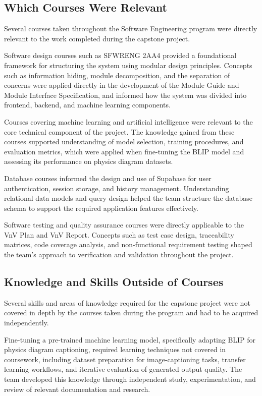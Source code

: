 \documentclass{article}
\begin{document}
\subsection{Which Courses Were Relevant}

Several courses taken throughout the Software Engineering program were directly 
relevant to the work completed during the capstone project.

Software design courses such as SFWRENG 2AA4 provided a foundational framework for 
structuring the system using modular design principles. Concepts such as information 
hiding, module decomposition, and the separation of concerns were applied directly 
in the development of the Module Guide and Module Interface Specification, and 
informed how the system was divided into frontend, backend, and machine learning 
components.

Courses covering machine learning and artificial intelligence were relevant to the 
core technical component of the project. The knowledge gained from these courses 
supported understanding of model selection, training procedures, and evaluation 
metrics, which were applied when fine-tuning the BLIP model and assessing its 
performance on physics diagram datasets.

Database courses informed the design and use of Supabase for user authentication, 
session storage, and history management. Understanding relational data models and 
query design helped the team structure the database schema to support the required 
application features effectively.

Software testing and quality assurance courses were directly applicable to the VnV 
Plan and VnV Report. Concepts such as test case design, traceability matrices, 
code coverage analysis, and non-functional requirement testing shaped the team's 
approach to verification and validation throughout the project.

\subsection{Knowledge and Skills Outside of Courses}

Several skills and areas of knowledge required for the capstone project were not 
covered in depth by the courses taken during the program and had to be acquired 
independently.

Fine-tuning a pre-trained machine learning model, specifically adapting BLIP for 
physics diagram captioning, required learning techniques not covered in coursework, 
including dataset preparation for image-captioning tasks, transfer learning 
workflows, and iterative evaluation of generated output quality. The team developed 
this knowledge through independent study, experimentation, and review of relevant 
documentation and research.
\end{document}
